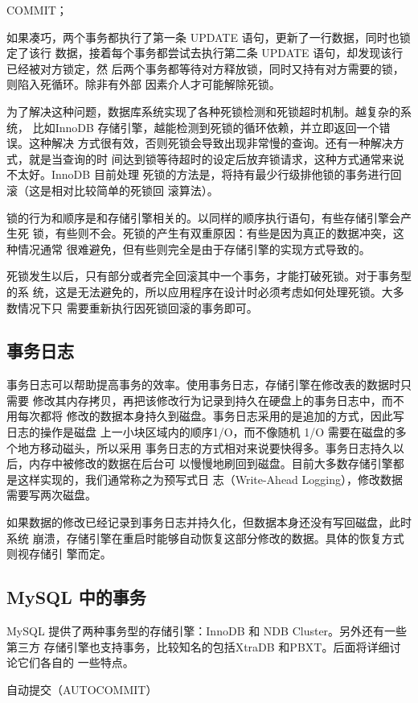 COMMIT；

如果凑巧，两个事务都执行了第一条 UPDATE 语句，更新了一行数据，同时也锁定了该行
数据，接着每个事务都尝试去执行第二条 UPDATE 语句，却发现该行已经被对方锁定，然
后两个事务都等待对方释放锁，同时又持有对方需要的锁，则陷入死循环。除非有外部
因素介人才可能解除死锁。

为了解决这种问题，数据库系统实现了各种死锁检测和死锁超时机制。越复杂的系统，
比如InnoDB 存储引擎，越能检测到死锁的循环依赖，并立即返回一个错误。这种解决
方式很有效，否则死锁会导致出现非常慢的查询。还有一种解决方式，就是当查询的时
间达到锁等待超时的设定后放弃锁请求，这种方式通常来说不太好。InnoDB 目前处理
死锁的方法是，将持有最少行级排他锁的事务进行回滚（这是相对比较简单的死锁回
滚算法）。

锁的行为和顺序是和存储引擎相关的。以同样的顺序执行语句，有些存储引擎会产生死
锁，有些则不会。死锁的产生有双重原因：有些是因为真正的数据冲突，这种情况通常
很难避免，但有些则完全是由于存储引擎的实现方式导致的。

死锁发生以后，只有部分或者完全回滚其中一个事务，才能打破死锁。对于事务型的系
统，这是无法避免的，所以应用程序在设计时必须考虑如何处理死锁。大多数情况下只
需要重新执行因死锁回滚的事务即可。

\subsection{事务日志}
事务日志可以帮助提高事务的效率。使用事务日志，存储引擎在修改表的数据时只需要
修改其内存拷贝，再把该修改行为记录到持久在硬盘上的事务日志中，而不用每次都将
修改的数据本身持久到磁盘。事务日志采用的是追加的方式，因此写日志的操作是磁盘
上一小块区域内的顺序1/O，而不像随机 1/O 需要在磁盘的多个地方移动磁头，所以采用
事务日志的方式相对来说要快得多。事务日志持久以后，内存中被修改的数据在后台可
以慢慢地刷回到磁盘。目前大多数存储引擎都是这样实现的，我们通常称之为预写式日
志（Write-Ahead Logging），修改数据需要写两次磁盘。

如果数据的修改已经记录到事务日志并持久化，但数据本身还没有写回磁盘，此时系统
崩溃，存储引擎在重启时能够自动恢复这部分修改的数据。具体的恢复方式则视存储引
擎而定。

\subsection{MySQL 中的事务}
MySQL 提供了两种事务型的存储引擎：InnoDB 和 NDB Cluster。另外还有一些第三方
存储引擎也支持事务，比较知名的包括XtraDB 和PBXT。后面将详细讨论它们各自的
一些特点。

自动提交（AUTOCOMMIT）

